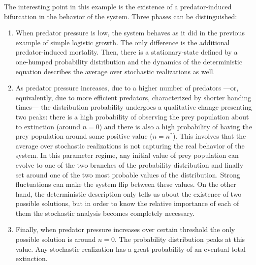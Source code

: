 \documentclass{article}
\begin{document}
The interesting point in this example is the existence of a predator-induced bifurcation in the behavior of the system. Three phases can be distinguished:
\begin{enumerate}
\item When predator pressure is low, the system behaves as it did in the previous example of simple logistic growth. The only difference is the additional predator-induced mortality. Then, there is a stationary-state defined by a one-humped probability distribution and the dynamics of the deterministic equation describes the average over stochastic realizations as well. 
\item As predator pressure increases, due to a higher number of predators ---or, equivalently, due to more efficient predators, characterized by shorter handing times--- the distribution probability undergoes a qualitative change presenting two peaks: there is a high probability of observing the prey population about to extinction (around $n=0$) and there is also a high probability of having the prey population around some positive value ($n=n^{*}$). This involves that the average over stochastic realizations is not capturing the real behavior of the system. In this parameter regime, any initial value of prey population can evolve to one of the two branches of the probability distribution and finally set around one of the two most probable values of the distribution. Strong fluctuations can make the system flip between these values. On the other hand, the deterministic description only tells us about the existence of two possible solutions, but in order to know the relative importance of each of them the stochastic analysis becomes completely necessary.  
\item Finally, when predator pressure increases over certain threshold the only possible solution is around $n=0$. The probability distribution peaks at this value. Any stochastic realization has a great probability of an eventual total extinction.
\end{enumerate}
\smallskip 
\end{document}
